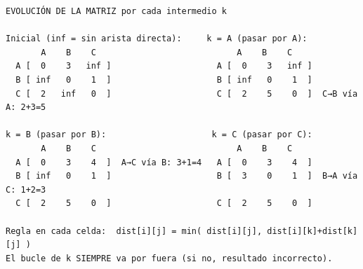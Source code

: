 \begin{dsacomofunciona}
\begin{verbatim}
EVOLUCIÓN DE LA MATRIZ por cada intermedio k

Inicial (inf = sin arista directa):     k = A (pasar por A):
       A    B    C                            A    B    C
  A [  0    3   inf ]                     A [  0    3   inf ]
  B [ inf   0    1  ]                     B [ inf   0    1  ]
  C [  2   inf   0  ]                     C [  2    5    0  ]  C→B vía A: 2+3=5

k = B (pasar por B):                     k = C (pasar por C):
       A    B    C                            A    B    C
  A [  0    3    4  ]  A→C vía B: 3+1=4   A [  0    3    4  ]
  B [ inf   0    1  ]                     B [  3    0    1  ]  B→A vía C: 1+2=3
  C [  2    5    0  ]                     C [  2    5    0  ]

Regla en cada celda:  dist[i][j] = min( dist[i][j], dist[i][k]+dist[k][j] )
El bucle de k SIEMPRE va por fuera (si no, resultado incorrecto).
\end{verbatim}
\end{dsacomofunciona}

